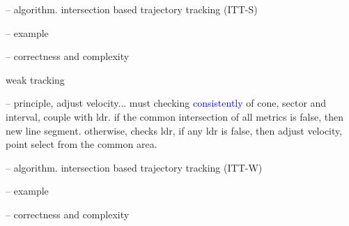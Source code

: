 -- algorithm. intersection based trajectory tracking (ITT-S)

-- example

-- correctness and complexity

weak tracking

-- principle, adjust velocity...
	must checking \textcolor{blue}{consistently} of cone, sector and interval, couple with ldr.
	if the common intersection of all metrics is false, then new line segment.
	otherwise, checks ldr, 	if any ldr is false, then adjust velocity, point select from the common area.
	
-- algorithm. intersection based trajectory tracking (ITT-W)

-- example

-- correctness and complexity
